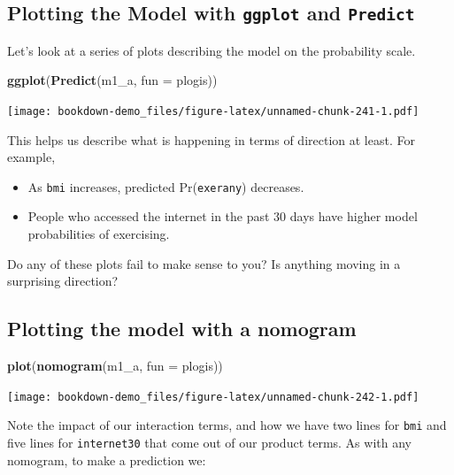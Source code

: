 \documentclass[]{book}
\newenvironment{Shaded}{\begin{snugshade}}{\end{snugshade}}
\newcommand{\KeywordTok}[1]{\textcolor[rgb]{0.13,0.29,0.53}{\textbf{#1}}}
\newcommand{\DataTypeTok}[1]{\textcolor[rgb]{0.13,0.29,0.53}{#1}}
\newcommand{\NormalTok}[1]{#1}
\providecommand{\tightlist}{%
  \setlength{\itemsep}{0pt}\setlength{\parskip}{0pt}}
\theoremstyle{definition}
\theoremstyle{definition}
\theoremstyle{definition}
\theoremstyle{remark}
\begin{document}
\subsection{\texorpdfstring{Plotting the Model with \texttt{ggplot} and
\texttt{Predict}}{Plotting the Model with ggplot and Predict}}\label{plotting-the-model-with-ggplot-and-predict}

Let's look at a series of plots describing the model on the probability
scale.

\begin{Shaded}
\begin{Highlighting}[]
\KeywordTok{ggplot}\NormalTok{(}\KeywordTok{Predict}\NormalTok{(m1_a, }\DataTypeTok{fun =}\NormalTok{ plogis))}
\end{Highlighting}
\end{Shaded}

\texttt{[image: bookdown-demo\_files/figure-latex/unnamed-chunk-241-1.pdf]}

This helps us describe what is happening in terms of direction at least.
For example,

\begin{itemize}
\tightlist
\item
  As \texttt{bmi} increases, predicted Pr(\texttt{exerany}) decreases.
\item
  People who accessed the internet in the past 30 days have higher model
  probabilities of exercising.
\end{itemize}

Do any of these plots fail to make sense to you? Is anything moving in a
surprising direction?

\subsection{Plotting the model with a
nomogram}\label{plotting-the-model-with-a-nomogram}

\begin{Shaded}
\begin{Highlighting}[]
\KeywordTok{plot}\NormalTok{(}\KeywordTok{nomogram}\NormalTok{(m1_a, }\DataTypeTok{fun =}\NormalTok{ plogis))}
\end{Highlighting}
\end{Shaded}

\texttt{[image: bookdown-demo\_files/figure-latex/unnamed-chunk-242-1.pdf]}

Note the impact of our interaction terms, and how we have two lines for
\texttt{bmi} and five lines for \texttt{internet30} that come out of our
product terms. As with any nomogram, to make a prediction we:
\end{document}
